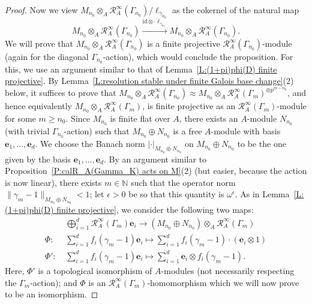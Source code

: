 \documentclass[12pt]{article}
\theoremstyle{definition}
\numberwithin{equation}{theorem}
\newcommand{\calR}{\mathcal{R}}
\newcommand{\NN}{\mathbb{N}}
\newcommand{\bbe}{\mathbf{e}}
\newcommand{\id}{\mathrm{id}}
\begin{document}
\begin{proof}
Now we view $M_{n_0} \otimes_A \calR_A^\infty
(\Gamma_{n_0})/\ell_{\gamma_{n_0}}$ as the cokernel of the natural map
\begin{equation}\label{E:short resolution}
M_{n_0} \otimes_A \calR_A^\infty(\Gamma_{n_0})
\xrightarrow{\id \otimes \cdot \ell_{\gamma_{n_0}}}
M_{n_0} \otimes_A \calR_A^\infty(\Gamma_{n_0}).
\end{equation}
We will prove that $M_{n_0} \otimes_A \calR_A^\infty(\Gamma_{n_0})$ is
a finite projective $\calR_A^\infty(\Gamma_{n_0})$-module (again for
the diagonal $\Gamma_{n_0}$-action), which would conclude the
proposition.  For this, we use an argument similar to that of
Lemma~\ref{L:(1+pi)phi(D) finite projective}.  By
Lemma~\ref{L:resolution stable under finite Galois base change}(2)
below, it suffices to prove that $M_{n_0} \otimes_A
\calR_A^\infty(\Gamma_{n_0}) \approx M_{n_0} \otimes_A
\calR_A^\infty(\Gamma_m)^{\oplus p^{m-n_0}}$, and hence equivalently
$M_{n_0} \otimes_A \calR_A^\infty(\Gamma_m)$, is finite projective as
an $\calR_A^\infty(\Gamma_m)$-module for some $m\geq n_0$.  Since
$M_{n_0}$ is finite flat over $A$, there exists an $A$-module
$N_{n_0}$ (with trivial $\Gamma_{n_0}$-action) such that $M_{n_0}
\oplus N_{n_0}$ is a free $A$-module with basis $\bbe_1, \dots,
\bbe_d$.  We choose the Banach norm $|\cdot|_{M_{n_0} \oplus N_{n_0}}$
on $M_{n_0} \oplus N_{n_0}$ to be the one given by the basis $\bbe_1,
\dots, \bbe_d$.  By an argument similar to
Proposition~\ref{P:calR_A(Gamma_K) acts on M}(2) (but easier, because
the action is now linear), there exists $m \in \NN$ such that the
operator norm $\|\gamma_m -1\|_{M_{n_0} \oplus N_{n_0}} < 1$; let
$\epsilon >0$ be so that this quantity is $\omega^\epsilon$.  As in
Lemma~\ref{L:(1+pi)phi(D) finite projective}, we consider the
following two maps:
\begin{align*}
& \bigoplus_{i=1}^d \calR_A^\infty(\Gamma_m)\bbe_i
\longrightarrow
(M_{n_0} \oplus N_{n_0}) \otimes_A \calR_A^\infty(\Gamma_m)
\\
\Phi: \ & \sum_{i=1}^d f_i(\gamma_m-1) \bbe_i
\longmapsto
\sum_{i=1}^d f_i(\gamma_m-1) \cdot (\bbe_i \otimes 1)
\\
\Phi': \ & \sum_{i=1}^d f_i(\gamma_m-1) \bbe_i
\longmapsto
\sum_{i=1}^d \bbe_i \otimes f_i(\gamma_m-1).
\end{align*}
Here, $\Phi'$ is a topological isomorphism of $A$-modules (not
necessarily respecting the $\Gamma_m$-action); and $\Phi$ is an
$\calR_A^\infty(\Gamma_m)$-homomorphism which we will now prove to be
an isomorphism.


\end{proof}
\end{document}
